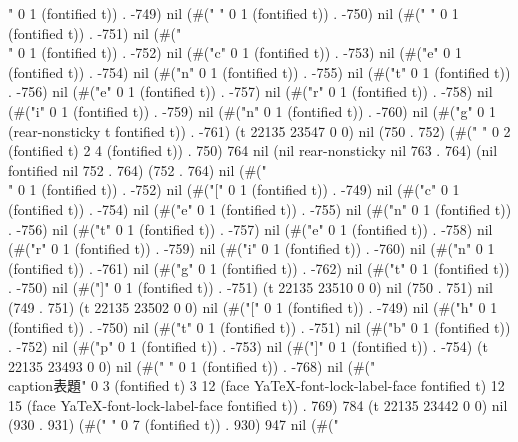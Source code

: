 " 0 1 (fontified t)) . -749) nil (#(" " 0 1 (fontified t)) . -750) nil (#(" " 0 1 (fontified t)) . -751) nil (#("\\" 0 1 (fontified t)) . -752) nil (#("c" 0 1 (fontified t)) . -753) nil (#("e" 0 1 (fontified t)) . -754) nil (#("n" 0 1 (fontified t)) . -755) nil (#("t" 0 1 (fontified t)) . -756) nil (#("e" 0 1 (fontified t)) . -757) nil (#("r" 0 1 (fontified t)) . -758) nil (#("i" 0 1 (fontified t)) . -759) nil (#("n" 0 1 (fontified t)) . -760) nil (#("g" 0 1 (rear-nonsticky t fontified t)) . -761) (t 22135 23547 0 0) nil (750 . 752) (#("   	" 0 2 (fontified t) 2 4 (fontified t)) . 750) 764 nil (nil rear-nonsticky nil 763 . 764) (nil fontified nil 752 . 764) (752 . 764) nil (#("\\" 0 1 (fontified t)) . -752) nil (#("[" 0 1 (fontified t)) . -749) nil (#("c" 0 1 (fontified t)) . -754) nil (#("e" 0 1 (fontified t)) . -755) nil (#("n" 0 1 (fontified t)) . -756) nil (#("t" 0 1 (fontified t)) . -757) nil (#("e" 0 1 (fontified t)) . -758) nil (#("r" 0 1 (fontified t)) . -759) nil (#("i" 0 1 (fontified t)) . -760) nil (#("n" 0 1 (fontified t)) . -761) nil (#("g" 0 1 (fontified t)) . -762) nil (#("t" 0 1 (fontified t)) . -750) nil (#("]" 0 1 (fontified t)) . -751) (t 22135 23510 0 0) nil (750 . 751) nil (749 . 751) (t 22135 23502 0 0) nil (#("[" 0 1 (fontified t)) . -749) nil (#("h" 0 1 (fontified t)) . -750) nil (#("t" 0 1 (fontified t)) . -751) nil (#("b" 0 1 (fontified t)) . -752) nil (#("p" 0 1 (fontified t)) . -753) nil (#("]" 0 1 (fontified t)) . -754) (t 22135 23493 0 0) nil (#("
" 0 1 (fontified t)) . -768) nil (#("   \\caption{表題}" 0 3 (fontified t) 3 12 (face YaTeX-font-lock-label-face fontified t) 12 15 (face YaTeX-font-lock-label-face fontified t)) . 769) 784 (t 22135 23442 0 0) nil (930 . 931) (#("       " 0 7 (fontified t)) . 930) 947 nil (#("
